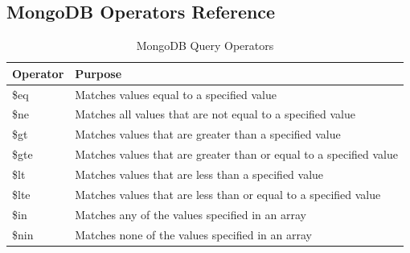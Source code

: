 \documentclass[12pt,a4paper]{article}
\begin{document}
\subsection{MongoDB Operators Reference}

\begin{table}[H]
    \centering
    \begin{tabular}{|l|l|}
        \hline
        \textbf{Operator} & \textbf{Purpose} \\
        \hline
        \$eq & Matches values equal to a specified value \\
        \$ne & Matches all values that are not equal to a specified value \\
        \$gt & Matches values that are greater than a specified value \\
        \$gte & Matches values that are greater than or equal to a specified value \\
        \$lt & Matches values that are less than a specified value \\
        \$lte & Matches values that are less than or equal to a specified value \\
        \$in & Matches any of the values specified in an array \\
        \$nin & Matches none of the values specified in an array \\
        \hline
    \end{tabular}
    \caption{MongoDB Query Operators}
    \label{tab:mongo-ops}
\end{table}
\end{document}

